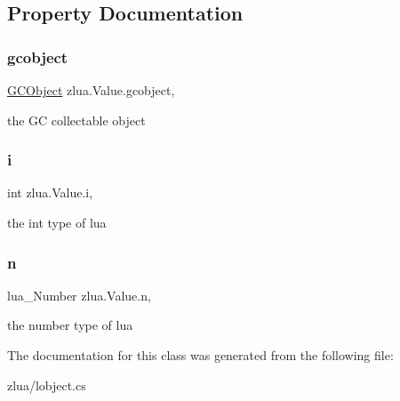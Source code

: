 \subsection{Property Documentation}
\mbox{\label{classzlua_1_1_value_af997ede3cb8de1aceb31d342a3f878bb}} 
\subsubsection{\texorpdfstring{gcobject}{gcobject}}
{\footnotesize\ttfamily \mbox{\hyperlink{classzlua_1_1_g_c_object}{G\+C\+Object}} zlua.\+Value.\+gcobject\hspace{0.3cm}{\ttfamily [get]}, {\ttfamily [set]}}



the GC collectable object 

\mbox{\label{classzlua_1_1_value_a310972c4cacdce5ad26c822d4837591d}} 
\subsubsection{\texorpdfstring{i}{i}}
{\footnotesize\ttfamily int zlua.\+Value.\+i\hspace{0.3cm}{\ttfamily [get]}, {\ttfamily [set]}}



the int type of lua 

\mbox{\label{classzlua_1_1_value_a2e93be2270276b85ddbbe0eb6e1cf447}} 
\subsubsection{\texorpdfstring{n}{n}}
{\footnotesize\ttfamily lua\+\_\+\+Number zlua.\+Value.\+n\hspace{0.3cm}{\ttfamily [get]}, {\ttfamily [set]}}



the number type of lua 



The documentation for this class was generated from the following file\+:\begin{DoxyCompactItemize}
\item 
zlua/lobject.\+cs\end{DoxyCompactItemize}
